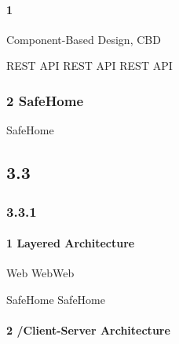 \hypertarget{section-26}{%
\paragraph{1}\label{section-26}}

Component-Based Design, CBD


\important{}


\important{}

\important{}

\important{}


\important{} REST API REST API REST API

\important{}

\hypertarget{safehome-1}{%
\subsubsection{2 SafeHome}\label{safehome-1}}


SafeHome



\hypertarget{section-27}{%
\subsection{3.3}\label{section-27}}

\hypertarget{section-28}{%
\subsubsection{3.3.1}\label{section-28}}

\hypertarget{layered-architecture}{%
\paragraph{1 Layered Architecture}\label{layered-architecture}}

\important{}

\important{}

\important{}

\important{}

Web WebWeb

SafeHome SafeHome

\hypertarget{client-server-architecture}{%
\paragraph{2 /Client-Server
Architecture}\label{client-server-architecture}}

